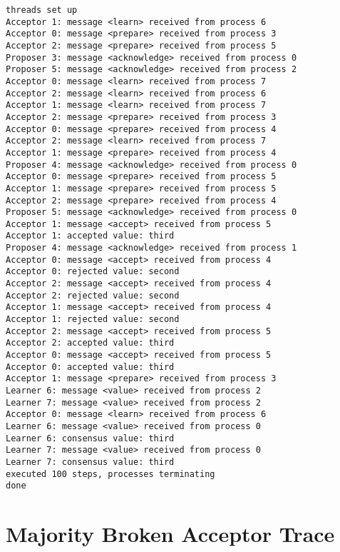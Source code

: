 \documentclass[a4paper, 12pt]{article}
\begin{document}
\begin{lstlisting}
threads set up
Acceptor 1: message <learn> received from process 6
Acceptor 0: message <prepare> received from process 3
Acceptor 2: message <prepare> received from process 5
Proposer 3: message <acknowledge> received from process 0
Proposer 5: message <acknowledge> received from process 2
Acceptor 0: message <learn> received from process 7
Acceptor 2: message <learn> received from process 6
Acceptor 1: message <learn> received from process 7
Acceptor 2: message <prepare> received from process 3
Acceptor 0: message <prepare> received from process 4
Acceptor 2: message <learn> received from process 7
Acceptor 1: message <prepare> received from process 4
Proposer 4: message <acknowledge> received from process 0
Acceptor 0: message <prepare> received from process 5
Acceptor 1: message <prepare> received from process 5
Acceptor 2: message <prepare> received from process 4
Proposer 5: message <acknowledge> received from process 0
Acceptor 1: message <accept> received from process 5
Acceptor 1: accepted value: third
Proposer 4: message <acknowledge> received from process 1
Acceptor 0: message <accept> received from process 4
Acceptor 0: rejected value: second
Acceptor 2: message <accept> received from process 4
Acceptor 2: rejected value: second
Acceptor 1: message <accept> received from process 4
Acceptor 1: rejected value: second
Acceptor 2: message <accept> received from process 5
Acceptor 2: accepted value: third
Acceptor 0: message <accept> received from process 5
Acceptor 0: accepted value: third
Acceptor 1: message <prepare> received from process 3
Learner 6: message <value> received from process 2
Learner 7: message <value> received from process 2
Acceptor 0: message <learn> received from process 6
Learner 6: message <value> received from process 0
Learner 6: consensus value: third
Learner 7: message <value> received from process 0
Learner 7: consensus value: third
executed 100 steps, processes terminating
done
\end{lstlisting}

\section{Majority Broken Acceptor Trace}\label{app:majorityAcceptorFailure}
\end{document}
